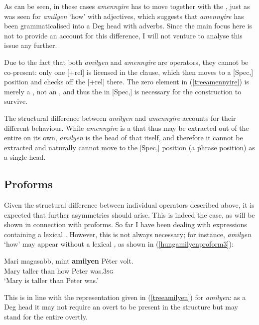 As can be seen, in these cases \textit{amennyire} has to move together with the , just as was seen for \textit{amilyen} `how' with adjectives, which suggests that \textit{amennyire} has been grammaticalised into a Deg head with adverbs. Since the main focus here is not to provide an account for this difference, I will not venture to analyse this issue any further.

Due to the fact that both \textit{amilyen} and \textit{amennyire} are operators, they cannot be co-present: only one [+rel]  is licensed in the clause, which then moves to a [Spec,] position and checks off the [+rel]  there. The zero element in (\ref{treeamennyire}) is merely a , not an , and thus the  in [Spec,] is necessary for the construction to survive.

The structural difference between \textit{amilyen} and \textit{amennyire} accounts for their different behaviour. While \textit{amennyire} is a   that thus may be extracted out of the entire  on its own, \textit{amilyen} is the head of that  itself, and therefore it cannot be extracted and naturally cannot move to the [Spec,] position (a phrase position) as a single head.

\subsection{Proforms} \label{sec:3proforms}
Given the structural difference between individual operators described above, it is expected that further asymmetries should arise. This is indeed the case, as will be shown in connection with proforms. So far I have been dealing with  expressions containing a lexical . However, this is not always necessary; for instance, \textit{amilyen} `how' may appear without a lexical , as shown in (\ref{hungamilyenproform3}):

\ea \gll Mari	magasabb,	mint \textbf{amilyen} Péter volt. \label{hungamilyenproform3}\\
Mary taller	than how Peter was.\textsc{3sg}\\
\glt `Mary is taller than Peter was.'
\z
	
This is in line with the representation given in (\ref{treeamilyen}) for \textit{amilyen}: as a Deg head it may not require an overt  to be present in the structure but may stand for the entire  overtly.

